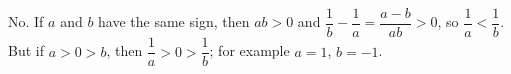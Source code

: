 No. If $a$ and $b$ have the same sign, then $ab>0$ and $\dfrac{1}{b}-\dfrac{1}{a}=\dfrac{a-b}{ab}>0$, so $\dfrac{1}{a}<\dfrac{1}{b}$. But if $a>0>b$, then $\dfrac{1}{a}>0>\dfrac{1}{b}$; for example $a=1$, $b=-1$.
